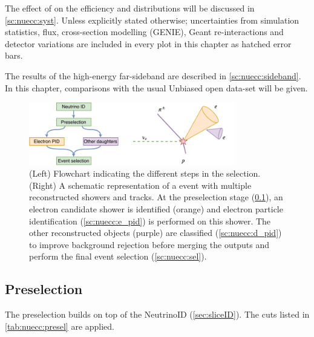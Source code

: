 The effect of \systs on the efficiency and distributions will be discussed in \cref{sc:nuecc:syst}. Unless explicitly stated otherwise; uncertainties from simulation statistics, flux, cross-section modelling (GENIE), Geant re-interactions and detector variations are included in every plot in this chapter as hatched error bars.

The results of the high-energy far-sideband are described in \cref{sc:nuecc:sideband}. In this chapter, comparisons with the usual \unbpot Unbiased open data-set will be given. 

\begin{figure}[htb]
    \centering
    \includegraphics[width = 0.8\textwidth]{NueCCsel/Images/nueccflow}
    \caption[Flowchart indicating the different steps in the \nuecc selection]{(Left) Flowchart indicating the different steps in the \nuecc selection. (Right) A schematic representation of a \nuecc event with multiple reconstructed showers and tracks. At the preselection stage (\cref{sc:nuecc:presel}), an electron candidate shower is identified (orange) and electron particle identification (\cref{sc:nuecc:e_pid}) is performed on this shower. The other reconstructed objects (purple) are classified (\cref{sc:nuecc:d_pid}) to improve background rejection before merging the outputs and perform the final event selection (\cref{sc:nuecc:sel}).}
    \label{fig:nue_flow}
\end{figure}

\subsection{Preselection}
\label{sc:nuecc:presel}


The preselection builds on top of the NeutrinoID (\cref{sec:sliceID}). The cuts listed in \cref{tab:nuecc:presel} are applied.

